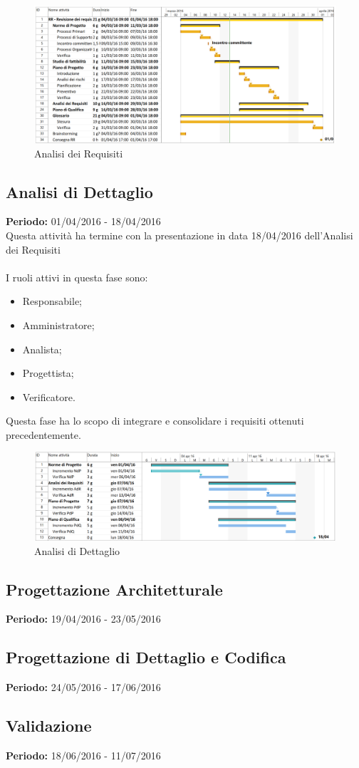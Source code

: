 \newpage
\begin{figure}
	\centering
	\includegraphics[width= 16cm]{AR.png}
	\caption{Analisi dei Requisiti}
\end{figure}


\subsection{Analisi di Dettaglio}
\textbf{Periodo:} 01/04/2016 - 18/04/2016\\
Questa attività ha termine con la presentazione in data 18/04/2016 dell'Analisi 
dei Requisiti\\\\
I ruoli attivi in questa fase sono:

\begin{itemize}
	\item Responsabile;
	\item Amministratore;
	\item Analista;
	\item Progettista;
	\item Verificatore.
\end{itemize}
Questa fase ha lo scopo di integrare e consolidare i requisiti ottenuti 
precedentemente.

\newpage
\begin{figure}
	\centering
	\includegraphics[width= 16cm]{AD.png}
	\caption{Analisi di Dettaglio}
\end{figure}

\subsection{Progettazione Architetturale}
\textbf{Periodo:} 19/04/2016 - 23/05/2016\\

\subsection{Progettazione di Dettaglio e Codifica}
\textbf{Periodo:} 24/05/2016 - 17/06/2016\\

\subsection{Validazione}
\textbf{Periodo:} 18/06/2016 - 11/07/2016\\